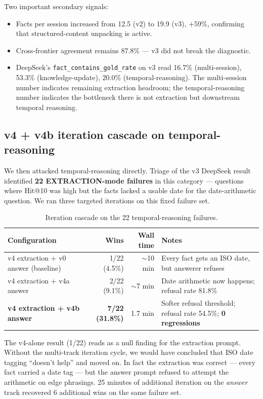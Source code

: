 \documentclass{article}
\begin{document}
Two important secondary signals:

\begin{itemize}
  \item Facts per session increased from 12.5 (v2) to 19.9 (v3), $+59\%$, confirming that structured-content unpacking is active.
  \item Cross-frontier agreement remains 87.8\% --- v3 did not break the diagnostic.
  \item DeepSeek's \texttt{fact\_contains\_gold\_rate} on v3 read 16.7\% (multi-session), 53.3\% (knowledge-update), 20.0\% (temporal-reasoning). The multi-session number indicates remaining extraction headroom; the temporal-reasoning number indicates the bottleneck there is not extraction but downstream temporal reasoning.
\end{itemize}

\subsection{v4 + v4b iteration cascade on temporal-reasoning}
\label{sec:v4b}

We then attacked temporal-reasoning directly. Triage of the v3 DeepSeek result identified \textbf{22 EXTRACTION-mode failures} in this category --- questions where Hit@10 was high but the facts lacked a usable date for the date-arithmetic question. We ran three targeted iterations on this fixed failure set.

\begin{table}[h]
\centering
\small
\caption{Iteration cascade on the 22 temporal-reasoning failures.}
\label{tab:v4cascade}
\begin{tabular}{lrrp{5.4cm}}
\toprule
Configuration                         & Wins   & Wall time & Notes \\
\midrule
v4 extraction + v0 answer (baseline)  & 1/22 (4.5\%)  & $\sim$10 min  & Every fact gets an ISO date, but answerer refuses \\
v4 extraction + v4a answer            & 2/22 (9.1\%)  & $\sim$7 min   & Date arithmetic now happens; refusal rate 81.8\% \\
\textbf{v4 extraction + v4b answer}   & \textbf{7/22 (31.8\%)} & 1.7 min & Softer refusal threshold; refusal rate 54.5\%; \textbf{0 regressions} \\
\bottomrule
\end{tabular}
\end{table}

The v4-alone result (1/22) reads as a null finding for the extraction prompt. Without the multi-track iteration cycle, we would have concluded that ISO date tagging ``doesn't help'' and moved on. In fact the extraction was correct --- every fact carried a date tag --- but the answer prompt refused to attempt the arithmetic on edge phrasings. 25 minutes of additional iteration on the \emph{answer} track recovered 6 additional wins on the same failure set.
\end{document}
